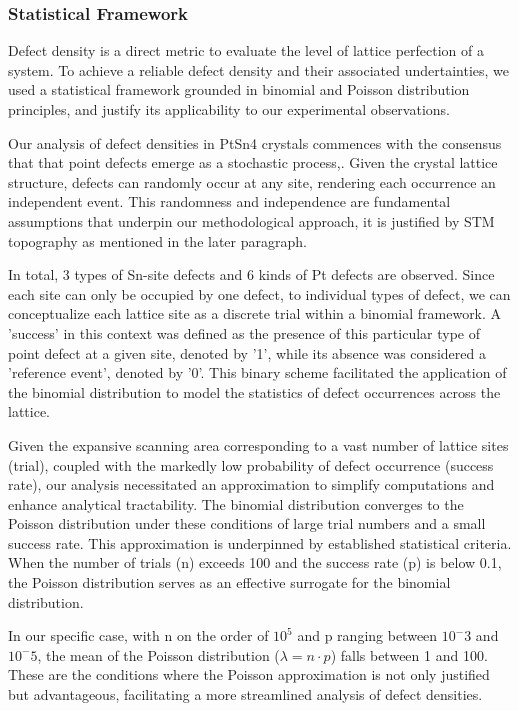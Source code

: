 \subsubsection{Statistical Framework}
Defect density is a direct metric to evaluate the level of lattice perfection of a system. To achieve a reliable defect density and their associated undertainties, we used a statistical framework grounded in binomial and Poisson distribution principles, and justify its applicability to our experimental observations.
\par Our analysis of defect densities in PtSn4 crystals commences with the consensus that that point defects emerge as a stochastic process\cite{rudolphDefectFormationCrystal2010},\cite{mosquera-loisImperfectionsAreNot2023}. Given the crystal lattice structure, defects can randomly occur at any site, rendering each occurrence an independent event. This randomness and independence are fundamental assumptions that underpin our methodological approach, it is justified by STM topography as mentioned in the later paragraph.  
\par In total, 3 types of Sn-site defects and 6 kinds of Pt defects are observed. Since each site can only be occupied by one defect, to individual types of defect, we can conceptualize each lattice site as a discrete trial within a binomial framework. A 'success' in this context was defined as the presence of this particular type of point defect at a given site, denoted by '1', while its absence was considered a 'reference event', denoted by '0'. This binary scheme facilitated the application of the binomial distribution to model the statistics of defect occurrences across the lattice.
\par Given the expansive scanning area corresponding to a vast number of lattice sites (trial), coupled with the markedly low probability of defect occurrence (success rate), our analysis necessitated an approximation to simplify computations and enhance analytical tractability. The 
binomial distribution converges to the Poisson distribution under these conditions of large trial numbers and a small success rate. This approximation is underpinned by established statistical criteria. When the number of trials (n) exceeds 100 and the success rate (p) is below 0.1, the Poisson distribution serves as an effective surrogate for the binomial distribution. 
\par In our specific case, with n on the order of $10^5$ and p ranging between $10^-3$ and $10^-5$, the mean of the Poisson distribution ($\lambda=n\cdot p$) falls between 1 and 100. These are the conditions where the Poisson approximation is not only justified but advantageous, facilitating a more streamlined analysis of defect densities.

